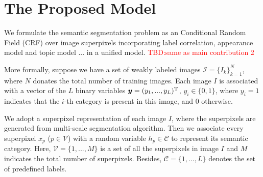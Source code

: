 
\section{The Proposed Model}

We formulate the semantic segmentation problem as an Conditional Random Field (CRF) over image superpixels incorporating label correlation, appearance model and topic model ... in a unified model. {\textcolor{red}{TBD:same as main contribution 2}}

More formally, suppose we have a set of weakly labeled images $\mathcal{I}=\{I_k\}_{k=1}^N$, where $N$ donates the total number of training images. Each image $I$ is associated with a vector of the $L$ binary variables $\boldsymbol{y} = (y_1,...,y_L)^{\rm T}$, \ie $y_i \in \{0,1\}$, where $y_i=1$ indicates that the $i$-th category is present in this image, and $0$ otherwise.

We adopt a superpixel representation of each image $I$, where the superpixels are generated from multi-scale segmentation algorithm. Then we associate every superpixel $x_p$ ($p \in \mathcal{V}$) with a random variable $h_p \in \mathcal{C}$ to represent its semantic category. Here, $\mathcal{V} = \{1,...,M\}$ is a set of all the superpixels in image $I$ and $M$ indicates the total number of superpixels. Besides, $\mathcal{C} = \{1,...,L\}$ denotes the set of predefined labels.

